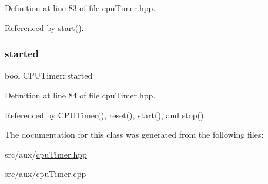 Definition at line 83 of file cpu\+Timer.\+hpp.



Referenced by start().

\mbox{\label{class_c_p_u_timer_a8fde2f68dd2f4811400429dcf9a4a6c7}} 
\subsubsection{\texorpdfstring{started}{started}}
{\footnotesize\ttfamily bool C\+P\+U\+Timer\+::started\hspace{0.3cm}{\ttfamily [private]}}



Definition at line 84 of file cpu\+Timer.\+hpp.



Referenced by C\+P\+U\+Timer(), reset(), start(), and stop().



The documentation for this class was generated from the following files\+:\begin{DoxyCompactItemize}
\item 
src/aux/\hyperlink{cpu_timer_8hpp}{cpu\+Timer.\+hpp}\item 
src/aux/\hyperlink{cpu_timer_8cpp}{cpu\+Timer.\+cpp}\end{DoxyCompactItemize}
